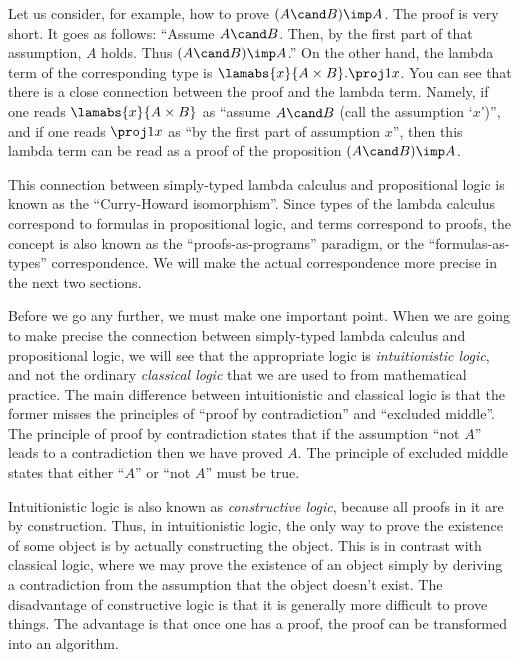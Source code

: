\documentclass[12pt]{article}
\begin{document}
Let us consider, for example, how to prove $(A\cand B)\imp A$. The
proof is very short. It goes as follows: ``Assume $A\cand B$. Then, by
the first part of that assumption, $A$ holds. Thus $(A\cand B)\imp
A$.'' On the other hand, the lambda term of the corresponding type is
$\lamabs{x}{A\times B}.\proj1 x$. You can see that there is a close
connection between the proof and the lambda term. Namely, if one reads
$\lamabs{x}{A\times B}$ as ``assume $A\cand B$ (call the assumption
`$x$')'', and if one reads $\proj1 x$ as ``by the first part of
assumption $x$'', then this lambda term can be read as a proof of 
the proposition $(A\cand B)\imp A$.

This connection between simply-typed lambda calculus and propositional
logic is known as the ``Curry-Howard isomorphism''. Since types of the
lambda calculus correspond to formulas in propositional logic, and
terms correspond to proofs, the concept is also known as the
``proofs-as-programs'' paradigm, or the ``formulas-as-types''
correspondence. We will make the actual correspondence more precise in
the next two sections.

Before we go any further, we must make one important point. When we
are going to make precise the connection between simply-typed lambda
calculus and propositional logic, we will see that the appropriate
logic is {\em intuitionistic logic}, and not the ordinary {\em
  classical logic} that we are used to from mathematical practice. The
main difference between intuitionistic and classical logic is that the
former misses the principles of ``proof by contradiction'' and
``excluded middle''. The principle of proof by contradiction states
that if the assumption ``not $A$'' leads to a contradiction then we
have proved $A$. The principle of excluded middle states that either
``$A$'' or ``not $A$'' must be true. 

Intuitionistic logic is also known as {\em constructive logic},
because all proofs in it are by construction. Thus, in intuitionistic
logic, the only way to prove the existence of some object is by
actually constructing the object. This is in contrast with classical
logic, where we may prove the existence of an object simply by
deriving a contradiction from the assumption that the object doesn't
exist. The disadvantage of constructive logic is that it is generally
more difficult to prove things. The advantage is that once one has a
proof, the proof can be transformed into an algorithm. 

\end{document}
